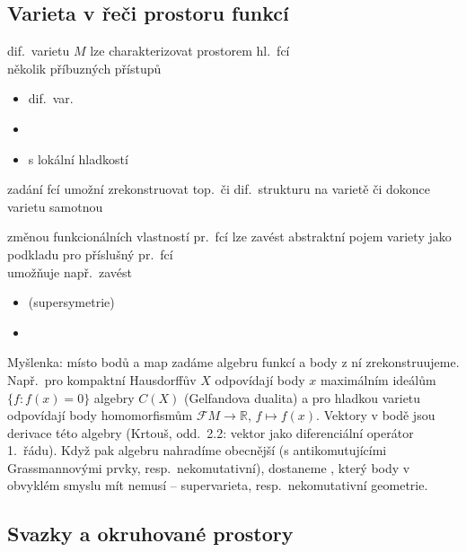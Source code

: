 \subsection{Varieta v řeči prostoru funkcí}

dif.\ varietu $M$ lze charakterizovat prostorem hl.\ fcí \\
několik příbuzných přístupů
\begin{itemize}[nosep]
  \item {} dif.\ var.
  \item {}
  \item {} s lokální hladkostí
\end{itemize}

zadání  fcí umožní zrekonstruovat top.\ či dif.\ strukturu na varietě či dokonce varietu samotnou

změnou funkcionálních vlastností pr.\ fcí lze zavést abstraktní pojem variety jako podkladu pro příslušný pr.\ fcí \\
umožňuje např.\ zavést
\begin{itemize}[nosep]
  \item[]  \quad (supersymetrie)
  \item[] 
\end{itemize}

\begin{vysvetleni}
Myšlenka: místo bodů a map zadáme algebru funkcí a body z ní zrekonstruujeme. Např.\ pro kompaktní Hausdorffův $X$ odpovídají body $x$ maximálním ideálům
$\{f: f(x)=0\}$ algebry $C(X)$ (Gelfandova dualita) a pro hladkou varietu odpovídají body homomorfismům $\mathcal{F}M\to\mathbb{R}$, $f\mapsto f(x)$.
Vektory v bodě jsou derivace této algebry (Krtouš, odd.~2.2: vektor jako diferenciální operátor 1.\ řádu).
Když pak algebru nahradíme obecnější (s antikomutujícími Grassmannovými prvky, resp.\ nekomutativní), dostaneme , který body v obvyklém smyslu
mít nemusí -- supervarieta, resp.\ nekomutativní geometrie.
\end{vysvetleni}

\newpage
{}
\subsection{Svazky a okruhované prostory}

